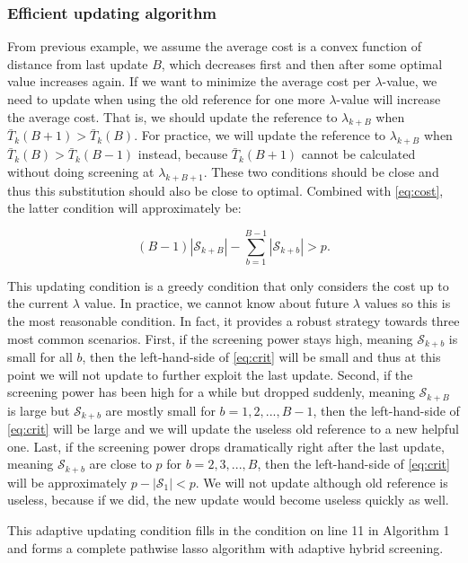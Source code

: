 \subsubsection{Efficient updating algorithm}

From previous example, we assume the average cost is a convex function of distance from last update $B$, which decreases first and then after some optimal value increases again. If we want to minimize the average cost per $\lambda$-value, we need to update when using the old reference for one more $\lambda$-value will increase the average cost. That is, we should update the reference to $\lambda_{k+B}$ when $\bar{T}_k(B+1)>\bar{T}_k(B)$. For practice, we will update the reference to $\lambda_{k+B}$ when $\bar{T}_k(B)>\bar{T}_k(B-1)$ instead, because $\bar{T}_k(B+1)$ cannot be calculated without doing screening at $\lambda_{k+B+1}$. These two conditions should be close and thus this substitution should also be close to optimal. Combined with \eqref{eq:cost}, the latter condition will approximately be:

\begin{equation}
    \label{eq:crit}
    (B-1)|\mathcal{S}_{k+B}|-\sum_{b=1}^{B-1}|\mathcal{S}_{k+b}|>p.
\end{equation}


This updating condition is a greedy condition that only considers the cost up to the current $\lambda$ value. In practice, we cannot know about future $\lambda$ values so this is the most reasonable condition. In fact, it provides a robust strategy towards three most common scenarios. First, if the screening power stays high, meaning $\mathcal{S}_{k+b}$ is small for all $b$, then the left-hand-side of \eqref{eq:crit} will be small and thus at this point we will not update to further exploit the last update. Second, if the screening power has been high for a while but dropped suddenly, meaning $\mathcal{S}_{k+B}$ is large but $\mathcal{S}_{k+b}$ are mostly small for $b=1,2,...,B-1$, then the left-hand-side of \eqref{eq:crit} will be large and we will update the useless old reference to a new helpful one. Last, if the screening power drops dramatically right after the last update, meaning $\mathcal{S}_{k+b}$ are close to $p$ for $b=2,3,...,B$, then the left-hand-side of \eqref{eq:crit} will be approximately $p-|\mathcal{S}_1|<p$. We will not update although old reference is useless, because if we did, the new update would become useless quickly as well.

This adaptive updating condition fills in the condition on line 11 in Algorithm 1 and forms a complete pathwise lasso algorithm with adaptive hybrid screening. 


